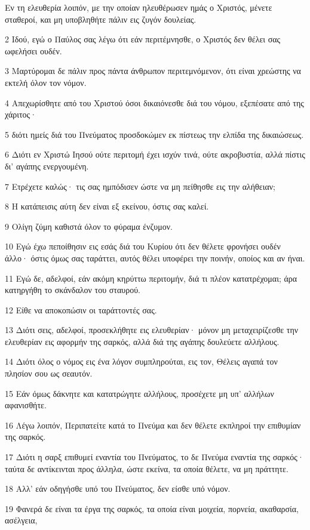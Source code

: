 \par Εν τη ελευθερία λοιπόν, με την οποίαν ηλευθέρωσεν ημάς ο Χριστός, μένετε σταθεροί, και μη υποβληθήτε πάλιν εις ζυγόν δουλείας.
\par 2 Ιδού, εγώ ο Παύλος σας λέγω ότι εάν περιτέμνησθε, ο Χριστός δεν θέλει σας ωφελήσει ουδέν.
\par 3 Μαρτύρομαι δε πάλιν προς πάντα άνθρωπον περιτεμνόμενον, ότι είναι χρεώστης να εκτελή όλον τον νόμον.
\par 4 Απεχωρίσθητε από του Χριστού όσοι δικαιόνεσθε διά του νόμου, εξεπέσατε από της χάριτος·
\par 5 διότι ημείς διά του Πνεύματος προσδοκώμεν εκ πίστεως την ελπίδα της δικαιώσεως.
\par 6 Διότι εν Χριστώ Ιησού ούτε περιτομή έχει ισχύν τινά, ούτε ακροβυστία, αλλά πίστις δι' αγάπης ενεργουμένη.
\par 7 Ετρέχετε καλώς· τις σας ημπόδισεν ώστε να μη πείθησθε εις την αλήθειαν;
\par 8 Η κατάπεισις αύτη δεν είναι εξ εκείνου, όστις σας καλεί.
\par 9 Ολίγη ζύμη καθιστά όλον το φύραμα ένζυμον.
\par 10 Εγώ έχω πεποίθησιν εις εσάς διά του Κυρίου ότι δεν θέλετε φρονήσει ουδέν άλλο· όστις όμως σας ταράττει, αυτός θέλει υποφέρει την ποινήν, οποίος και αν ήναι.
\par 11 Εγώ δε, αδελφοί, εάν ακόμη κηρύττω περιτομήν, διά τι πλέον κατατρέχομαι; άρα κατηργήθη το σκάνδαλον του σταυρού.
\par 12 Είθε να αποκοπώσιν οι ταράττοντές σας.
\par 13 Διότι σεις, αδελφοί, προσεκλήθητε εις ελευθερίαν· μόνον μη μεταχειρίζεσθε την ελευθερίαν εις αφορμήν της σαρκός, αλλά διά της αγάπης δουλεύετε αλλήλους.
\par 14 Διότι όλος ο νόμος εις ένα λόγον συμπληρούται, εις τον, Θέλεις αγαπά τον πλησίον σου ως σεαυτόν.
\par 15 Εάν όμως δάκνητε και κατατρώγητε αλλήλους, προσέχετε μη υπ' αλλήλων αφανισθήτε.
\par 16 Λέγω λοιπόν, Περιπατείτε κατά το Πνεύμα και δεν θέλετε εκπληροί την επιθυμίαν της σαρκός.
\par 17 Διότι η σαρξ επιθυμεί εναντία του Πνεύματος, το δε Πνεύμα εναντία της σαρκός· ταύτα δε αντίκεινται προς άλληλα, ώστε εκείνα, τα οποία θέλετε, να μη πράττητε.
\par 18 Αλλ' εάν οδηγήσθε υπό του Πνεύματος, δεν είσθε υπό νόμον.
\par 19 Φανερά δε είναι τα έργα της σαρκός, τα οποία είναι μοιχεία, πορνεία, ακαθαρσία, ασέλγεια,
